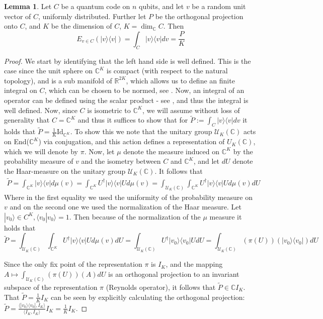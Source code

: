 \documentclass{article}
\def\R{\mathbb{R}}
\def\C{\mathbb{C}}
\def\U{\mathcal{U}}
\def\Id{\text{Id}}
\theoremstyle{definition}
\newtheorem{lem}[Satz]{Lemma}
\begin{document}
\begin{lem}\label{expvalproj}
Let $C$ be a quantum code on $n$ qubits, and let $v$ be a random unit vector of $C$, uniformly distributed. Further let $P$ be the orthogonal projection onto $C$, and $K$ be the dimension of $C$, $K = \dim_\C C$.
Then \begin{equation} E_{v \in C}(|v\rangle \langle v |) = \int_C |v \rangle \langle v | dv = \frac{P}{K} \end{equation}
\begin{proof}
 We start by identifying that the left hand side is well defined. This is the case since the unit sphere on $\C^K$ is compact (with respect to the natural topology), and is a sub manifold of $\R^{2K}$, 
 which allows us to define an finite integral on $C$, which can be chosen to be normed, see \cite{foerster}. Now, an integral of an operator can be defined using the scalar product - see \cite{harmana}, and thus the integral is well defined.
 Now, since $C$ is isometric to $\C^K$, we will assume without loss of generality that $C = \C^K$ and thus it suffices to show that for $\tilde P := \int_C |v \rangle \langle v | dv$ it holds that $\tilde P = \frac{1}{K} \Id_{\C^K}$.
To show this we note that the unitary group $\U_K(\C)$ acts on End($\C^K$) via conjugation, and this action defines a representation of $U_K(\C)$, which we will denote by $\pi$. Now, let $\mu$ denote the measure induced on $\C^K$ by the probability measure of $v$ and the isometry
between $C$ and $\C^K$, and let $dU$ denote the Haar-measure on the unitary group $\U_K(\C)$. It follows that
\begin{align}
\tilde P = \int_{\C^K} |v \rangle \langle v | d \mu(v) = \int_{\C^K} U^\dagger |v \rangle \langle v | U d \mu(v) = \int_{\U_K(\C)} \int_{\C^K} U^\dagger |v \rangle \langle v | U d \mu(v) dU
\end{align}
Where in the first equality we used the uniformity of the probability measure on $v$ and on the second one we used the normalization of the Haar measure. Let $ |v_0 \rangle \in C^K, \langle v_0 | v_0 \rangle = 1$. Then because of the normalization of the $\mu$ measure it holds that
\begin{equation}
\tilde P = \int_{\U_K(\C)} \int_{\C^K} U^\dagger |v \rangle \langle v | U d \mu(v) dU = \int_{\U_K(\C)} U^\dagger |v_0 \rangle \langle v_0 | U dU =  \int_{\U_K(\C)} (\pi(U))( |v_0 \rangle \langle v_0 | ) dU
\end{equation}

Since the only fix point of the representation $\pi$ is $I_K$, and the mapping $A \mapsto \int_{\U_K(\C)} (\pi(U))(A) dU$ is an orthogonal projection to an invariant subspace of the representation $\pi$ (Reynolds operator), it follows that
$\tilde P \in \C I_K$. That $\tilde P = \frac{1}{K} I_K$ can be seen by explicitly calculating the orthogonal projection: $\tilde P = \frac{\langle |v_0 \rangle \langle v_0 |, I_K \rangle}{ \langle I_K, I_K \rangle} I_K = \frac{1}{K} I_K$.
\end{proof}
\end{lem}
\end{document}
